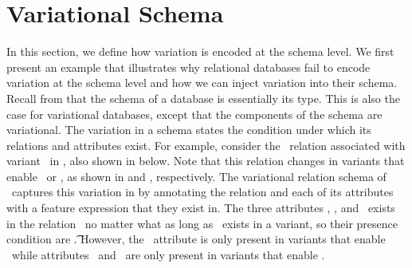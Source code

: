\section{Variational Schema}
\label{sec:vsch}


In this section, we define how variation is encoded at the schema level. We first 
present an example that
 illustrates why relational databases fail to encode
variation at the schema level and how we can inject variation into their schema.
Recall from  that the schema of a database is essentially its type.
This is also the case for variational databases, except that the components 
of the schema are variational.
The  variation in a schema states the condition under which its relations and
attributes exist.
%
For example, consider the \empbio\ relation associated with variant \vThree\ in ,
also shown in  below.
% 
Note that this relation changes in variants that enable \vFour\ or \vFive, as shown in 
 and , respectively.
%
The variational relation schema of \empbio\ captures this variation
in  by annotating the relation and each of its attributes with
 a feature expression that they exist in.
The three attributes 
\empno, \sex, and \birthdate\ exists in the relation \empbio\ no matter what as long as
\empbio\ exists in a variant, so their presence condition are \t. 
However, the \name\ attribute is only present in variants
that enable \vFour\ while attributes \fname\ and \lname\ are only present in variants
that enable \vFive.



